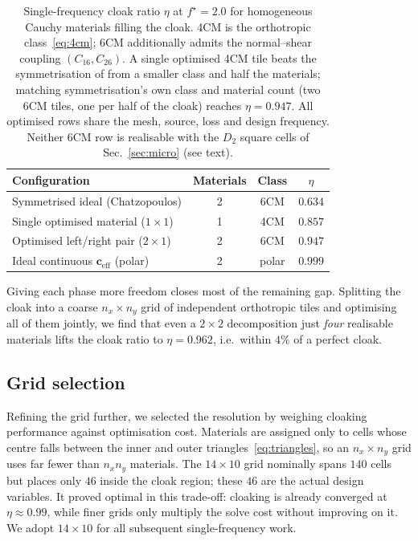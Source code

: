 \documentclass[preprint,12pt]{elsarticle}
\newcommand{\mbf}[1]{\mathbf{#1}}
\begin{document}
\begin{table}[htbp]
\centering
\caption{Single-frequency cloak ratio $\eta$ at $f^\star=2.0$ for homogeneous
Cauchy materials filling the cloak. 4CM is the orthotropic
class~\eqref{eq:4cm}; 6CM additionally admits the normal--shear coupling
$(C_{16},C_{26})$. A single optimised 4CM tile beats the symmetrisation of
\citet{chatzopoulos2023} from a smaller class and half the materials; matching
symmetrisation's own class and material count (two 6CM tiles, one per half of
the cloak) reaches $\eta=0.947$. All optimised rows share the mesh, source,
loss and design frequency. Neither 6CM row is realisable with the $D_2$ square
cells of Sec.~\ref{sec:micro} (see text).}
\label{tab:single_vs_sym}
\begin{tabular*}{\textwidth}{@{\extracolsep{\fill}}lccc@{}}
\toprule
Configuration & Materials & Class & $\eta$ \\
\midrule
Symmetrised ideal (Chatzopoulos)           & 2   & 6CM            & $0.634$ \\
Single optimised material ($1\times1$)     & 1   & 4CM            & $0.857$ \\
Optimised left/right pair ($2\times1$)     & 2   & 6CM            & $\mathbf{0.947}$ \\
\midrule
Ideal continuous $\mbf{c}_{\mathrm{eff}}$ (polar) & 2 & polar & $0.999$ \\
\bottomrule
\end{tabular*}
\end{table}

Giving each phase more freedom closes most of the remaining gap. Splitting
the cloak into a coarse $n_x\times n_y$ grid of independent orthotropic tiles
and optimising all of them jointly, we find that even a $2\times2$
decomposition  just \emph{four} realisable materials  lifts the cloak
ratio to $\eta=0.962$, i.e.\ within $4\%$ of a perfect cloak. 

\subsection{Grid selection}
\label{subsec:grid_selection}

Refining the grid further, we selected the resolution by weighing cloaking
performance against optimisation cost. Materials are assigned only to cells
whose centre falls between the inner and outer triangles~\eqref{eq:triangles},
so an $n_x\times n_y$ grid uses far fewer than $n_x n_y$ materials. The
$14\times10$ grid nominally spans $140$ cells but places only $46$ inside the
cloak region; these $46$ are the actual design variables. It proved optimal in
this trade-off: cloaking is already converged at $\eta\approx0.99$, while
finer grids only multiply the solve cost without improving on it. We adopt
$14\times10$ for all subsequent single-frequency work.
\end{document}
